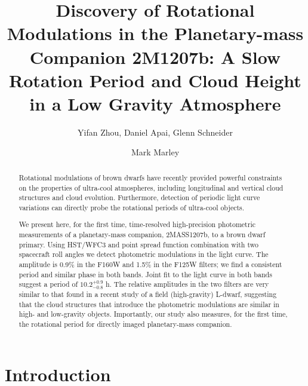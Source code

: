 \documentclass[apj]{emulateapj}
\begin{document}
\title{Discovery of Rotational Modulations in the Planetary-mass
  Companion 2M1207b: A Slow Rotation Period and Cloud Height in a Low
  Gravity Atmosphere}
\author{Yifan Zhou, Daniel Apai, Glenn Schneider}
\author{Mark Marley}

\begin{abstract}
  Rotational modulations of brown dwarfs have recently provided
  powerful constraints on the properties of ultra-cool atmospheres,
  including longitudinal and vertical cloud structures and cloud
  evolution. Furthermore, detection of periodic light curve variations
  can directly probe the rotational periods of ultra-cool objects.

  We present here, for the first time, time-resolved high-precision
  photometric measurements of a planetary-mass companion, 2MASS1207b,
  to a brown dwarf primary. Using HST/WFC3 and point spread
  function %
  combination with two spacecraft roll angles we detect photometric
  modulations in the light curve. The amplitude is 0.9\% in the F160W
  and 1.5\% in the F125W filters; we find a consistent period and
  similar phase in both bands. Joint fit to the light curve in both
  bands suggest a period of $10.2^{+0.9}_{-0.8}$ h. The relative
  amplitudes in the two filters are very similar to that found in a
  recent study of a field (high-gravity) L-dwarf, suggesting that the
  cloud structures that introduce the photometric modulations are
  similar in high- and low-gravity objects. Importantly, our study
  also measures, for the first time, the rotational period for
  directly imaged planetary-mass companion.
\end{abstract}

\maketitle
%
\section{Introduction}
\end{document}
